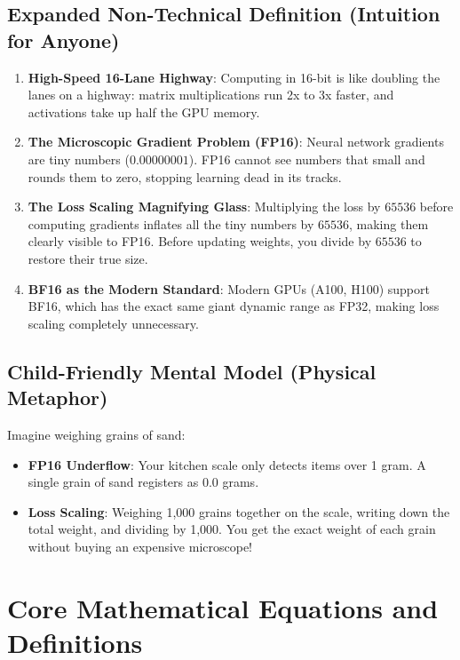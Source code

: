 \documentclass[11pt,a4paper]{article}
\theoremstyle{definition}
\begin{document}
\subsection{Expanded Non-Technical Definition (Intuition for Anyone)}
\begin{enumerate}
    \item \textbf{High-Speed 16-Lane Highway}: Computing in 16-bit is like doubling the lanes on a highway: matrix multiplications run 2x to 3x faster, and activations take up half the GPU memory.
    \item \textbf{The Microscopic Gradient Problem (FP16)}: Neural network gradients are tiny numbers ($0.00000001$). FP16 cannot see numbers that small and rounds them to zero, stopping learning dead in its tracks.
    \item \textbf{The Loss Scaling Magnifying Glass}: Multiplying the loss by $65536$ before computing gradients inflates all the tiny numbers by $65536$, making them clearly visible to FP16. Before updating weights, you divide by $65536$ to restore their true size.
    \item \textbf{BF16 as the Modern Standard}: Modern GPUs (A100, H100) support BF16, which has the exact same giant dynamic range as FP32, making loss scaling completely unnecessary.
\end{enumerate}

\subsection{Child-Friendly Mental Model (Physical Metaphor)}
Imagine weighing grains of sand:
\begin{itemize}
    \item \textbf{FP16 Underflow}: Your kitchen scale only detects items over 1 gram. A single grain of sand registers as $0.0$ grams.
    \item \textbf{Loss Scaling}: Weighing 1,000 grains together on the scale, writing down the total weight, and dividing by 1,000. You get the exact weight of each grain without buying an expensive microscope!
\end{itemize}

\section{Core Mathematical Equations and Definitions}
\end{document}
